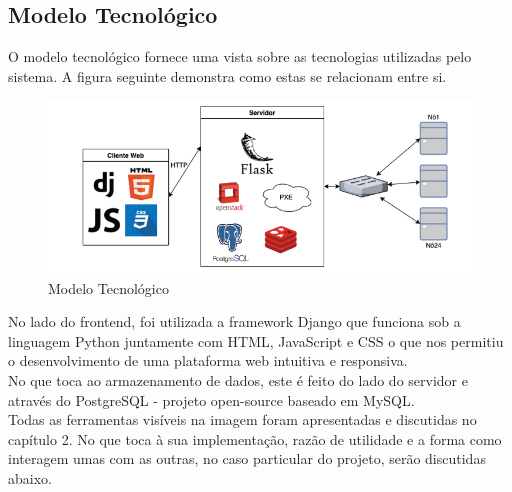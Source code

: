 \subsection{Modelo Tecnológico}
O modelo tecnológico fornece uma vista sobre as tecnologias utilizadas pelo sistema. A figura seguinte demonstra como estas se relacionam entre si.

\begin{figure}[!ht]
    \centering
    \includegraphics[height=0.3\textheight]{images/tecno.png}
    \caption{Modelo Tecnológico}
    \label{fig:tecno}
\end{figure}
\hfill\break
No lado do frontend, foi utilizada a framework Django que funciona sob a linguagem Python juntamente com HTML, JavaScript e CSS o que nos permitiu o desenvolvimento de uma plataforma web intuitiva e responsiva.\newline\\
No que toca ao armazenamento de dados, este é feito do lado do servidor e através do PostgreSQL - projeto open-source baseado em MySQL.\newline\\
Todas as ferramentas visíveis na imagem foram apresentadas e discutidas no capítulo 2. No que toca à sua implementação, razão de utilidade e a forma como interagem umas com as outras, no caso particular do projeto, serão discutidas abaixo.
\newpage
\hfill\break